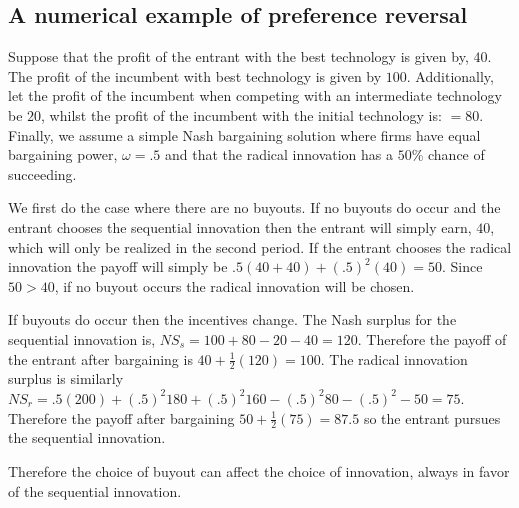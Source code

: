 \documentclass[11pt]{article}
\newtheorem{proposition}{Proposition}
\begin{document}
\subsection*{A numerical example of preference reversal}

Suppose that the profit of the entrant with the best technology is given by, $40$. The profit of the incumbent with best technology is given by $100$. Additionally, let the profit of the incumbent when competing with an intermediate technology be $20$, whilst the profit of the incumbent with the initial technology is: $=80$. Finally, we assume a simple Nash bargaining solution where firms have equal bargaining power, $\omega = .5$ and that the radical innovation has a $50$\% chance of succeeding. 

We first do the case where there are no buyouts. If no buyouts do occur and the entrant chooses the sequential innovation then the entrant will simply earn, $40$, which will only be realized in the second period. If the entrant chooses the radical innovation the payoff will simply be $.5(40+40)+(.5)^2(40)=50$. Since $50>40$, if no buyout occurs the radical innovation will be chosen. 

If buyouts do occur then the incentives change. The Nash surplus for the sequential innovation is, $NS_s = 100+80-20-40=120$. Therefore the payoff of the entrant after bargaining is $40+\frac{1}{2}(120)=100$. The radical innovation surplus is similarly $NS_r = .5(200)+(.5)^2 180+(.5)^2 160-(.5)^2 80-(.5)^2-50=75$. Therefore the payoff after bargaining $50+\frac{1}{2}(75)=87.5$ so the entrant pursues the sequential innovation. 

Therefore the choice of buyout can affect the choice of innovation, always in favor of the sequential innovation. 



\end{document}
